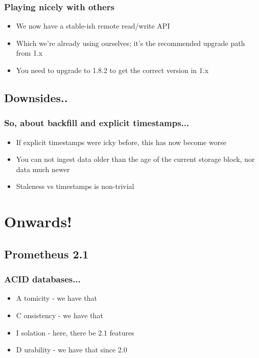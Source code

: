 \documentclass[t]{beamer}
\begin{document}
\begin{frame}
	\frametitle{Playing nicely with others}
	\begin{itemize}
		\item We now have a stable-ish remote read/write API
		\item Which we're already using ourselves; it's the recommended upgrade path from 1.x
		\item You need to upgrade to 1.8.2 to get the correct version in 1.x
	\end{itemize}
\end{frame}


\subsection{Downsides..}

\begin{frame}
	\frametitle{So, about backfill and explicit timestamps...}
	\begin{itemize}
		\item If explicit timestamps were icky before, this has now become worse
		\item You can not ingest data older than the age of the current storage block, nor data much newer
		\item Staleness vs timestamps is non-trivial
	\end{itemize}
\end{frame}



\section{Onwards!}


\subsection{Prometheus 2.1}

\begin{frame}
	\frametitle{ACID databases...}
	\begin{itemize}
		\item A tomicity - we have that
		\item C onsistency - we have that
		\item I solation - here, there be 2.1 features
		\item D urability - we have that since 2.0
	\end{itemize}
\end{frame}
\end{document}
